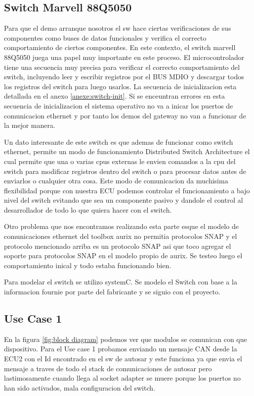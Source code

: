 \subsection{Switch Marvell 88Q5050}

Para que el demo arranque nosotros el sw hace ciertas verificaciones de sus componentes como buses de datos funcionales y verifica el correcto comportamiento de ciertos componentes. En este contexto, el switch marvell 88Q5050 juega una papel muy importante en este proceso. El microcontrolador tiene una secuencia muy precisa para verificar el correcto comportamiento del switch, incluyendo leer y escribir registros por el BUS MDIO y descargar todos los registros del switch para luego usarlos. La secuencia de inicializacion esta detallada en el anexo \ref{anexe:switch-init}. Si se enceuntran errores en esta secuencia de inicializacion el sistema operativo no va a inicar los puertos de comunicacion ethernet y por tanto los demos del gateway no van a funcionar de la mejor manera.


Un dato interesante de este switch es que ademas de funcionar como switch ethernet, permite un modo de funcionamiento Distributed Switch Architecture el cual permite que una o varias cpus externas le envien comandos a la cpu del switch para modificar registros dentro del switch o para procesar datos antes de enviarlos o cualquier otra cosa. Este modo de comunicacion da muchisima flexibilidad porque con nuestra ECU podemos controlar el funcionamiento a bajo nivel del switch evitando que sea un componente pasivo y dandole el control al desarrollador de todo lo que quiera hacer con el switch.


Otro problema que nos encontramos realizando esta parte esque el modelo de comunicaciones ethernet del toolbox aurix no permitia protocolos SNAP y el protocolo mencionado arriba es un protocolo SNAP asi que toco agregar el soporte para protocolos SNAP en el modelo propio de aurix. Se testeo luego el comportamiento inical y todo estaba funcionando bien.

Para modelar el switch se utilizo systemC. Se modelo el Switch con base a la informacion fournie por parte del fabricante y se siguio con el proyecto.

\subsection{Use Case 1}

En la figura \ref{fig:block diagram} podemos ver que modulos se comunican con que dispositivo. Para el Use case 1 probamos enviando un mensaje CAN desde la ECU2 con el Id encontrado en el sw de autosar y este funciona ya que envia el mensaje a traves de todo el stack de comunicaciones de autosar pero lastimosamente cuando llega al socket adapter se muere porque los puertos no han sido activados, mala configuracion del switch.

